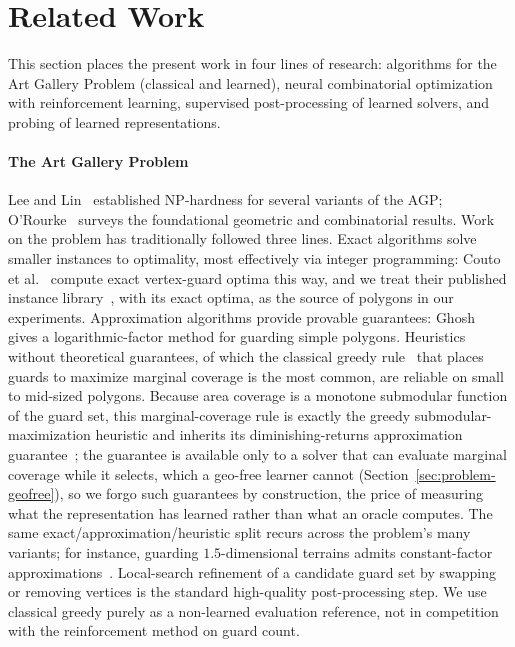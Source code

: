 \documentclass[11pt]{article}
\begin{document}
\section{Related Work}
\label{sec:related}

This section places the present work in four lines of research: algorithms for the Art Gallery Problem (classical and learned), neural combinatorial optimization with reinforcement learning, supervised post-processing of learned solvers, and probing of learned representations.

\paragraph{The Art Gallery Problem} Lee and Lin~\cite{LeeLin1986} established NP-hardness for several variants of the AGP; O'Rourke~\cite{ORourke1987AGT} surveys the foundational geometric and combinatorial results. Work on the problem has traditionally followed three lines. Exact algorithms solve smaller instances to optimality, most effectively via integer programming: Couto et al.~\cite{Couto2011ExactAGP} compute exact vertex-guard optima this way, and we treat their published instance library~\cite{art-gallery-instances-page}, with its exact optima, as the source of polygons in our experiments. Approximation algorithms provide provable guarantees: Ghosh~\cite{Ghosh2010ApproxAGP} gives a logarithmic-factor method for guarding simple polygons. Heuristics without theoretical guarantees, of which the classical greedy rule~\cite{GonzalezBanos2001} that places guards to maximize marginal coverage is the most common, are reliable on small to mid-sized polygons. Because area coverage is a monotone submodular function of the guard set, this marginal-coverage rule is exactly the greedy submodular-maximization heuristic and inherits its diminishing-returns approximation guarantee~\cite{NemhauserWolseyFisher1978}; the guarantee is available only to a solver that can evaluate marginal coverage while it selects, which a geo-free learner cannot (Section~\ref{sec:problem-geofree}), so we forgo such guarantees by construction, the price of measuring what the representation has learned rather than what an oracle computes. The same exact/approximation/heuristic split recurs across the problem's many variants; for instance, guarding $1.5$-dimensional terrains admits constant-factor approximations~\cite{journals/siamcomp/Ben-MosheKM07,EMMS08}. Local-search refinement of a candidate guard set by swapping or removing vertices is the standard high-quality post-processing step. We use classical greedy purely as a non-learned evaluation reference, not in competition with the reinforcement method on guard count.
\end{document}
